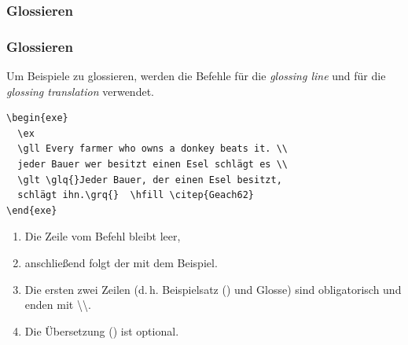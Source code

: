 \subsubsection{Glossieren}
\begin{frame}[fragile]

\frametitle{Glossieren}

Um Beispiele zu glossieren, werden die Befehle  für die \emph{glossing line} und  für die \emph{glossing translation} verwendet.

\begin{lstlisting}
\begin{exe}
  \ex
  \gll Every farmer who owns a donkey beats it. \\
  jeder Bauer wer besitzt einen Esel schlägt es \\
  \glt \glq{}Jeder Bauer, der einen Esel besitzt, 
  schlägt ihn.\grq{}  \hfill \citep{Geach62}
\end{exe} 
\end{lstlisting}


\begin{enumerate}
\item Die Zeile vom Befehl  bleibt leer,

\item anschließend folgt der  mit dem Beispiel. 

\item Die ersten zwei Zeilen (d.\,h. Beispielsatz () und Glosse) sind obligatorisch und enden mit \textbackslash\textbackslash .

\item Die Übersetzung () ist optional. 

\end{enumerate}

\end{frame}


